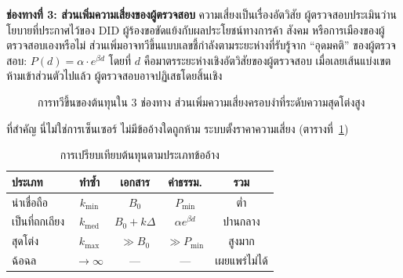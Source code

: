 \documentclass[11pt,a4paper,twocolumn]{article}
\begin{document}
\textbf{ช่องทางที่ 3: ส่วนเพิ่มความเสี่ยงของผู้ตรวจสอบ} ความเสี่ยงเป็นเรื่องอัตวิสัย ผู้ตรวจสอบประเมินว่านโยบายที่ประกาศไว้ของ DID ผู้ร้องขอขัดแย้งกับผลประโยชน์ทางการค้า สังคม หรือการเมืองของผู้ตรวจสอบเองหรือไม่ ส่วนเพิ่มอาจทวีขึ้นแบบเลขชี้กำลังตามระยะห่างที่รับรู้จาก ``อุดมคติ'' ของผู้ตรวจสอบ: $P(d) = \alpha \cdot e^{\beta d}$ โดยที่ $d$ คือมาตรระยะห่างเชิงอัตวิสัยของผู้ตรวจสอบ เมื่อเลยเส้นแบ่งเขตห้ามเข้าส่วนตัวไปแล้ว ผู้ตรวจสอบอาจปฏิเสธโดยสิ้นเชิง

\begin{figure}[ht]
\centering
{}
\caption{การทวีขึ้นของต้นทุนใน 3 ช่องทาง ส่วนเพิ่มความเสี่ยงครอบงำที่ระดับความสุดโต่งสูง}
\label{fig:radicalism}
\end{figure}

ที่สำคัญ นี่ไม่ใช่การเซ็นเซอร์ ไม่มีข้ออ้างใดถูกห้าม ระบบตั้งราคาความเสี่ยง (ตารางที่~\ref{tab:costs})

\begin{table}[ht]
\centering
\caption{การเปรียบเทียบต้นทุนตามประเภทข้ออ้าง}
\label{tab:costs}
\footnotesize
\begin{tabular}{@{}lcccc@{}}
\toprule
\textbf{ประเภท} & \textbf{ทำซ้ำ} & \textbf{เอกสาร} & \textbf{ค่าธรรม.} & \textbf{รวม} \\
\midrule
น่าเชื่อถือ & $k_{\min}$ & $B_0$ & $P_{\min}$ & ต่ำ \\
เป็นที่ถกเถียง & $k_{\text{med}}$ & $B_0{+}k\Delta$ & $\alpha e^{\beta d}$ & ปานกลาง \\
สุดโต่ง & $k_{\max}$ & $\gg B_0$ & $\gg P_{\min}$ & สูงมาก \\
ฉ้อฉล & $\to\infty$ & --- & --- & เผยแพร่ไม่ได้ \\
\bottomrule
\end{tabular}
\end{table}
\end{document}
